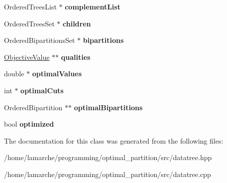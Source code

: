 \begin{DoxyCompactItemize}
\item 
\hypertarget{classOrderedDatatree_a63e87e1bdc0eaa3226eaad811a53bae6}{Ordered\-Trees\-List $\ast$ {\bfseries complement\-List}}\label{classOrderedDatatree_a63e87e1bdc0eaa3226eaad811a53bae6}

\item 
\hypertarget{classOrderedDatatree_ac13f35e59ddcf32a3b9ec11ec2a756d9}{Ordered\-Trees\-Set $\ast$ {\bfseries children}}\label{classOrderedDatatree_ac13f35e59ddcf32a3b9ec11ec2a756d9}

\item 
\hypertarget{classOrderedDatatree_a9bbd6bd520a9f0cf54da91c30b35c09e}{Ordered\-Bipartitions\-Set $\ast$ {\bfseries bipartitions}}\label{classOrderedDatatree_a9bbd6bd520a9f0cf54da91c30b35c09e}

\item 
\hypertarget{classOrderedDatatree_a3a1536573ceb5e61d8b271a1ebe9f44f}{\hyperlink{classObjectiveValue}{Objective\-Value} $\ast$$\ast$ {\bfseries qualities}}\label{classOrderedDatatree_a3a1536573ceb5e61d8b271a1ebe9f44f}

\item 
\hypertarget{classOrderedDatatree_a0bb2c4a9111b12dd2266ece96ffc836a}{double $\ast$ {\bfseries optimal\-Values}}\label{classOrderedDatatree_a0bb2c4a9111b12dd2266ece96ffc836a}

\item 
\hypertarget{classOrderedDatatree_a433aa570b06cb85e74b696b66a21c503}{int $\ast$ {\bfseries optimal\-Cuts}}\label{classOrderedDatatree_a433aa570b06cb85e74b696b66a21c503}

\item 
\hypertarget{classOrderedDatatree_a158f9eef6ebd0b9f66a15663f39439b5}{Ordered\-Bipartition $\ast$$\ast$ {\bfseries optimal\-Bipartitions}}\label{classOrderedDatatree_a158f9eef6ebd0b9f66a15663f39439b5}

\item 
\hypertarget{classOrderedDatatree_ac30581d76d9967d61ed9b5b66b1fb967}{bool {\bfseries optimized}}\label{classOrderedDatatree_ac30581d76d9967d61ed9b5b66b1fb967}

\end{DoxyCompactItemize}


The documentation for this class was generated from the following files\-:\begin{DoxyCompactItemize}
\item 
/home/lamarche/programming/optimal\-\_\-partition/src/datatree.\-hpp\item 
/home/lamarche/programming/optimal\-\_\-partition/src/datatree.\-cpp\end{DoxyCompactItemize}
